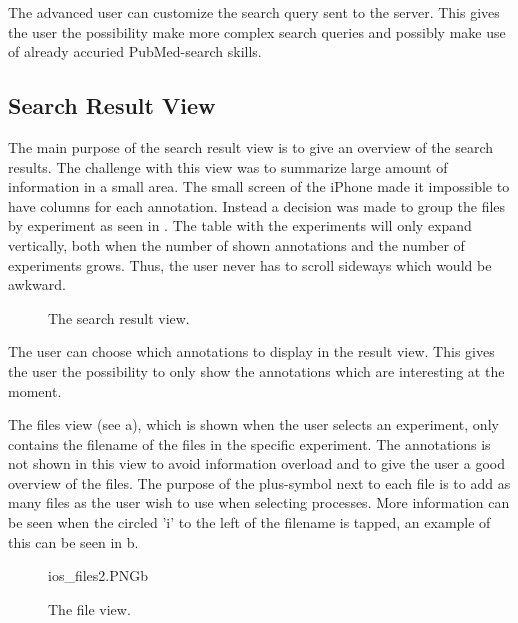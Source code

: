 The advanced user can customize the search query sent to the server. This gives the user the possibility make more complex search queries and possibly make use of already accuried PubMed-search skills.

\subsection{Search Result View}
The main purpose of the search result view is to give an overview of the search results. The challenge with this view was to summarize large amount of information in a small area. The small screen of the iPhone made it impossible to have columns for each annotation. Instead a decision was made to group the files by experiment as seen in . The table with the experiments will only expand vertically, both when the number of shown annotations and the number of experiments grows. Thus, the user never has to scroll sideways which would be awkward.

\begin{figure}[ht]
\caption{The search result view.}
\label{fig:ios_searchResult2}
\end{figure}
\FloatBarrier

The user can choose which annotations to display in the result view. This gives the user the possibility to only show the annotations which are interesting at the moment. 

The files view (see a), which is shown when the user selects an experiment, only contains the filename of the files in the specific experiment. The annotations is not shown in this view to avoid information overload and to give the user a good overview of the files. The purpose of the plus-symbol next to each file is to add as many files as the user wish to use when selecting processes. More information can be seen when the circled 'i' to the left of the filename is tapped, an example of this can be seen in b. 

\begin{figure}[ht]
		{ios_files2.PNG}{b}
\caption{The file view.}
\label{fig:ios_files2}
\end{figure}
\FloatBarrier




